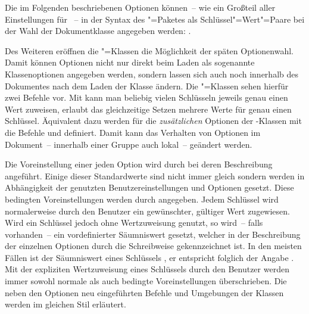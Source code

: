 Die im Folgenden beschriebenen Optionen können~-- wie ein Großteil aller 
Einstellungen für \KOMAScript~-- in der Syntax des "=Paketes 
als Schlüssel"=Wert"=Paare bei der Wahl der Dokumentklasse angegeben werden:
%
.

Des Weiteren eröffnen die \KOMAScript"=Klassen die Möglichkeit der späten 
Optionenwahl. Damit können Optionen nicht nur direkt beim Laden als sogenannte 
Klassenoptionen angegeben werden, sondern lassen sich auch noch innerhalb des 
Dokumentes nach dem Laden der Klasse ändern. Die \KOMAScript"=Klassen sehen 
hierfür zwei Befehle vor. Mit 
kann man beliebig vielen Schlüsseln jeweils genau einen Wert zuweisen, 
 erlaubt das 
gleichzeitige Setzen mehrere Werte für genau einen Schlüssel. Äquivalent 
dazu werden für die \emph{zusätzlichen} Optionen der \TUDScript-Klassen mit 
die Befehle  und 
 definiert. Damit kann
das Verhalten von Optionen im Dokument~-- innerhalb einer Gruppe auch lokal~-- 
geändert werden.

Die Voreinstellung einer jeden Option wird durch 
bei deren Beschreibung angeführt. Einige dieser Standardwerte sind nicht immer 
gleich sondern werden in Abhängigkeit der genutzten Benutzereinstellungen und 
Optionen gesetzt. Diese bedingten Voreinstellungen werden durch
\PValue{\,|\,}\PValue{:\,}%
 angegeben. Jedem Schlüssel wird normalerweise durch den 
Benutzer ein gewünschter, gültiger Wert zugewiesen. Wird ein Schlüssel jedoch 
ohne Wertzuweisung genutzt, so wird~-- falls vorhanden~-- ein vordefinierter 
Säumniswert gesetzt, welcher in der Beschreibung der einzelnen Optionen durch 
die  Schreibweise gekennzeichnet ist. In den meisten 
Fällen ist der Säumniswert eines Schlüssels , er entspricht 
folglich der Angabe . Mit der expliziten 
Wertzuweisung eines Schlüssels durch den Benutzer werden immer sowohl normale 
als auch bedingte Voreinstellungen überschrieben. Die neben den Optionen neu 
eingeführten Befehle und Umgebungen der Klassen werden im gleichen Stil 
erläutert.



